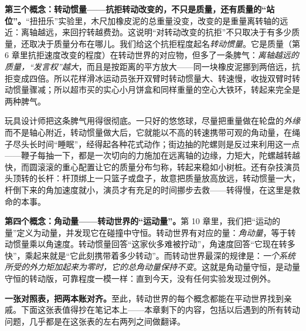 \begin{center}
\end{center}

\begin{mainline}
\textbf{第三个概念：转动惯量——抗拒转动改变的，不只是质量，还有质量的“站位”。}“扭扭乐”实验里，木尺加橡皮泥的总重量没变，改变的是重量离转轴的远近：离轴越远，来回拧转越费劲。这说明“对转动改变的抗拒”不只取决于有多少质量，还取决于质量分布在哪儿。我们给这个抗拒程度起名\emph{转动惯量}。它是质量（第 6 章里抗拒速度改变的程度）在转动世界的对应物，但多了一条脾气：\emph{离轴越远的质量，“发言权”越大}，而且是按距离的平方放大——同一块橡皮泥挪到两倍远，抗拒变成四倍。所以花样滑冰运动员张开双臂时转动惯量大、转速慢，收拢双臂时转动惯量骤减；所以超市买的实心小月饼盒和同样重量的空心大铁环，转起来完全是两种脾气。

玩具设计师把这条脾气用得很彻底。一只好的悠悠球，尽量把重量做在轮盘的\emph{外缘}而不是轴心附近，转动惯量做大后，它就能以不高的转速携带可观的角动量，在绳子尽头长时间“睡眠”，经得起各种花式动作；街边抽的陀螺则是反过来利用这一点——鞭子每抽一下，都是一次切向的力施加在远离轴的边缘，力矩大，陀螺越转越快，而圆滚滚的重心配置让它的质量分布匀称，转起来稳如小树桩。还有杂技演员头顶转的长杆：杆顶绑上一只篮子或盘子，故意把质量放高放远，转动惯量一大，杆倒下来的角加速度就小，演员才有充足的时间挪步去救——转得慢，在这里是救命的本事。

\textbf{第四个概念：角动量——转动世界的“运动量”。}第 10 章里，我们把“运动的量”定义为动量，并发现它在碰撞中守恒。转动世界有对应的量：\emph{角动量}，等于转动惯量乘以角速度。转动惯量回答“这家伙多难被拧动”，角速度回答“它现在转多快”，乘起来就是“它此刻携带着多少转动”。而转动世界最深的规律是：\emph{一个系统所受的外力矩加起来为零时，它的总角动量保持不变}。这就是角动量守恒，是动量守恒的转动版，可靠程度一模一样：直到今天，没有任何实验发现过例外。

\textbf{一张对照表，把两本账对齐。}至此，转动世界的每个概念都能在平动世界找到亲戚。下面这张表值得抄在笔记本上——本章剩下的内容，包括以后遇到的所有转动问题，几乎都是在这张表的左右两列之间做翻译。
\end{mainline}

